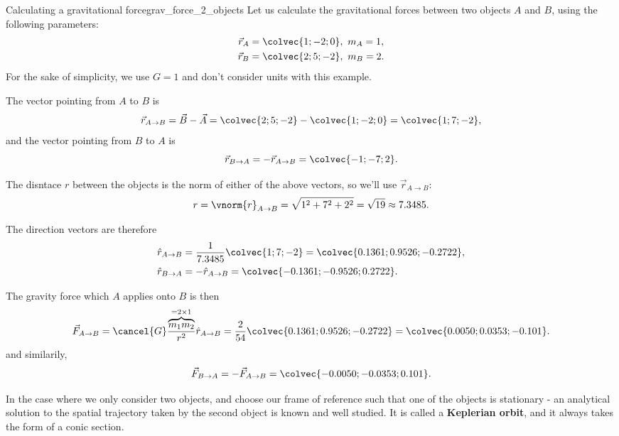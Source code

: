 \begin{example}{Calculating a gravitational force}{grav_force_2_objects}
  Let us calculate the gravitational forces between two objects $A$ and $B$, using the following parameters:
  \begin{align*}
    \vec{r}_{A}&=\colvec{1;-2;0},\ m_{A} = 1,\\
    \vec{r}_{B}&=\colvec{2;5;-2},\ m_{B} = 2.
  \end{align*}
  For the sake of simplicity, we use $G=1$ and don't consider units with this example.

  The vector pointing from $A$ to $B$ is
  \[
    \vec{r}_{A\to B} = \vec{B}-\vec{A} = \colvec{2;5;-2} - \colvec{1;-2;0} = \colvec{1;7;-2},
  \]
  and the vector pointing from $B$ to $A$ is
  \[
    \vec{r}_{B\to A} = -\vec{r}_{A\to B} = \colvec{-1;-7;2}.
  \]

  The disntace $r$ between the objects is the norm of either of the above vectors, so we'll use $\vec{r}_{A\to B}$:
  \[
    r = \vnorm{r}_{A\to B} = \sqrt{1^{2}+7^{2}+2^{2}} = \sqrt{19} \approx 7.3485.
  \]

  The direction vectors are therefore
  \begin{align*}
    \hat{r}_{A\to B} &= \frac{1}{7.3485}\colvec{1;7;-2} = \colvec{0.1361;0.9526;-0.2722},\\
    \hat{r}_{B\to A} &= -\hat{r}_{A\to B} = \colvec{-0.1361;-0.9526;0.2722}.
  \end{align*}

  The gravity force which $A$ applies onto $B$ is then
  \[
    \vec{F}_{A\to B} = \cancel{G}\frac{\overbrace{m_{1}m_{2}}^{=2\times1}}{r^{2}}\hat{r}_{A\to B} = \frac{2}{54}\colvec{0.1361;0.9526;-0.2722} = \colvec{0.0050;0.0353;-0.101}.
  \]
  and similarily,
  \[
    \vec{F}_{B\to A} = -\vec{F}_{A\to B} = \colvec{-0.0050;-0.0353;0.101}.
  \]
\end{example}

In the case where we only consider two objects, and choose our frame of reference such that one of the objects is stationary - an analytical solution to the spatial trajectory taken by the second object is known and well studied. It is called a \textbf{Keplerian orbit}, and it always takes the form of a conic section.

